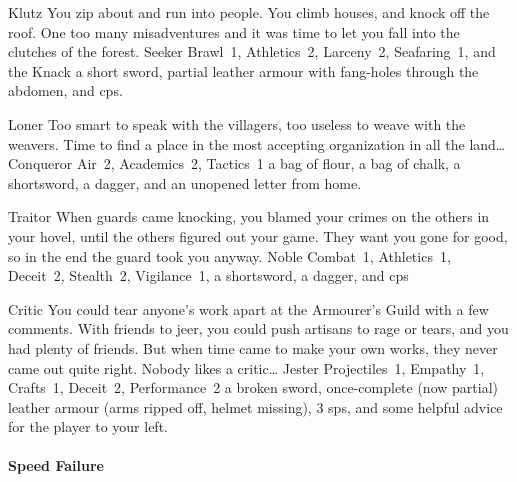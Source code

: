 \begin{multicols}{2}
\begin{itemize}
    {Klutz}%
    {
      You zip about and run into people.
      You climb houses, and knock off the roof.
      One too many misadventures and it was time to let you fall into the clutches of the forest.
    }%
    {Seeker}%
    {Brawl~1, Athletics~2, Larceny~2, Seafaring~1, and the Knack \charge}%
    {a short sword, partial leather armour with fang-holes through the abdomen, and  \glspl{cp}.}%

    {Loner}%
    {
      Too smart to speak with the villagers, too useless to weave with the weavers.
      Time to find a place in the most accepting organization in all the land\ldots
    }%
    {Conqueror}%
    {
      Air~2, Academics~2, Tactics~1
    }%
    {a bag of flour, a bag of chalk, a shortsword, a dagger, and an unopened letter from home.}%

    {Traitor}%
    {
      When guards came knocking, you blamed your crimes on the others in your hovel, until the others figured out your game.
      They want you gone for good, so in the end the \gls{guard} took you anyway.
    }%
    {Noble}%
    {
      Combat~1, Athletics~1, Deceit~2, Stealth~2, Vigilance~1,
    }%
    {a shortsword, a dagger, and  \glspl{cp}}%

    {Critic}%
    {
      You could tear anyone's work apart at the Armourer's Guild with a few comments.
      With friends to jeer, you could push artisans to rage or tears, and you had plenty of friends.
      But when time came to make your own works, they never came out quite right.
      Nobody likes a critic\ldots
    }%
    {Jester}%
    {
      Projectiles~1, Empathy~1, Crafts~1, Deceit~2, Performance~2
    }%
    {a broken sword, once-complete (now partial) leather armour (arms ripped off, helmet missing), 3 \glspl{sp}, and some helpful advice for the player to your left.}%

\end{itemize}

\paragraph{Speed Failure}

\begin{itemize}


\end{itemize}
\end{multicols}
